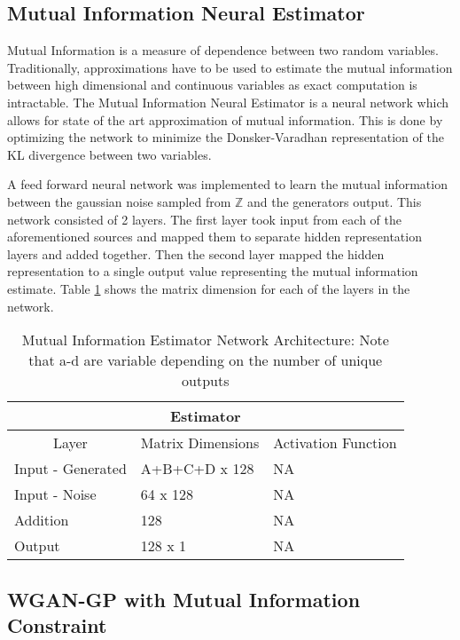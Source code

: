 \subsection{Mutual Information Neural Estimator}
\label{sec:mine}
Mutual Information is a measure of dependence between two random variables. Traditionally, approximations have to be used to estimate the mutual information between high dimensional and continuous variables as exact computation is intractable. The Mutual Information Neural Estimator is a neural network which allows for state of the art approximation of mutual information. This is done by optimizing the network to minimize the Donsker-Varadhan representation of the KL divergence between two variables. 

A feed forward neural network was implemented to learn the mutual information between the gaussian noise sampled from $\mathbb{Z}$ and the generators output. This network consisted of 2 layers. The first layer took input from each of the aforementioned sources and mapped them to separate hidden representation layers and added together. Then the second layer mapped the hidden representation to a single output value representing the mutual information estimate. Table \ref{tab:model_mi} shows the matrix dimension for each of the layers in the network.

\begin{table}[!htbp]
	\centering
	\caption{Mutual Information Estimator Network Architecture: Note that a-d are variable depending on the number of unique outputs}
	\label{tab:model_mi}
	\begin{tabular}{l|l|l}
		\hline
		\multicolumn{3}{c}{\textbf{Estimator}} \\ 
		\hline
		\multicolumn{1}{c|}{Layer} & \multicolumn{1}{c|}{Matrix Dimensions} & \multicolumn{1}{c}{Activation Function} \\ \hline
		Input - Generated & A+B+C+D x 128 & NA \\
		Input - Noise & 64 x 128 & NA \\
		Addition & 128 & NA \\ 
		Output & 128 x 1 &  NA \\
		\hline
	\end{tabular}
\end{table}


\subsection{WGAN-GP with Mutual Information Constraint}
\label{sec:gpmi}

